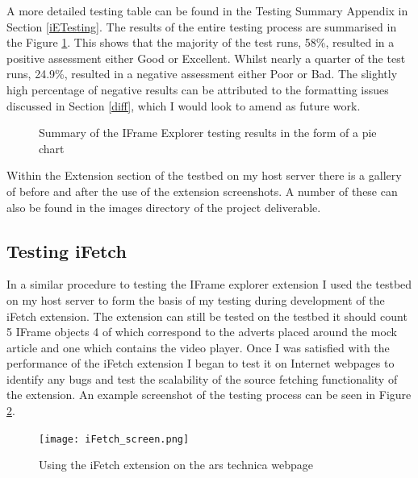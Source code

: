\documentclass[12pt]{article}
\begin{document}
A more detailed testing table can be found in the Testing Summary Appendix in Section \ref{iETesting}. The results of the entire testing process are summarised in the Figure \ref{fig:iePie}. This shows that the majority of the test runs, 58\%, resulted in a positive assessment either Good or Excellent. Whilst nearly a quarter of the test runs, 24.9\%, resulted in a negative assessment either Poor or Bad. The slightly high percentage of negative results can be attributed to the formatting issues discussed in Section \ref{diff}, which I would look to amend as future work. 

\begin{figure} [H]
    \centering
        \caption{Summary of the IFrame Explorer testing results in the form of a pie chart}
        \label{fig:iePie}
\end{figure}


Within the Extension section of the testbed on my host server there is a gallery of before and after the use of the extension screenshots. A number of these can also be found in the images directory of the project deliverable. 

\subsection{Testing iFetch}
In a similar procedure to testing the IFrame explorer extension I used the testbed on my host server to form the basis of my testing during development of the iFetch extension. The extension can still be tested on the testbed it should count 5 IFrame objects 4 of which correspond to the adverts placed around the mock article and one which contains the video player. Once I was satisfied with the performance of the iFetch extension I began to test it on Internet webpages to identify any bugs and test the scalability of the source fetching functionality of the extension. An example screenshot of the testing process can be seen in Figure \ref{fig:iFetch_screen}.  

\begin{figure}[H]
    \centering
    \texttt{[image: iFetch\_screen.png]}
    \caption{Using the iFetch extension on the ars technica webpage}
    \label{fig:iFetch_screen}
\end{figure}
\end{document}
